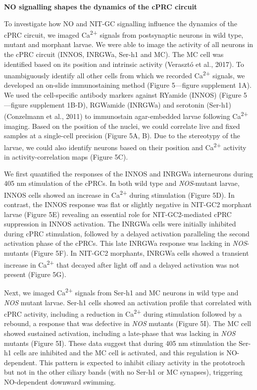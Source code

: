 \documentclass[
  10pt,
  onecolumn]{article}
\begin{document}
\textbf{NO signalling shapes the dynamics of the cPRC circuit}

To investigate how NO and NIT-GC signalling influence the dynamics of
the cPRC circuit, we imaged Ca\textsuperscript{2+} signals from
postsynaptic neurons in wild type, mutant and morphant larvae. We were
able to image the activity of all neurons in the cPRC circuit (INNOS,
INRGWa, Ser-h1 and MC). The MC cell was identified based on its position
and intrinsic activity (Verasztó et al., 2017). To unambiguously
identify all other cells from which we recorded Ca\textsuperscript{2+}
signals, we developed an on-slide immunostaining method (Figure
5---figure supplement 1A). We used the cell-specific antibody markers
against RYamide (INNOS) (Figure 5---figure supplement 1B-D), RGWamide
(INRGWa) and serotonin (Ser-h1) (Conzelmann et al., 2011) to immunostain
agar-embedded larvae following Ca\textsuperscript{2+} imaging. Based on
the position of the nuclei, we could correlate live and fixed samples at
a single-cell precision (Figure 5A, B). Due to the stereotypy of the
larvae, we could also identify neurons based on their position and
Ca\textsuperscript{2+} activity in activity-correlation maps (Figure
5C).

We first quantified the responses of the INNOS and INRGWa interneurons
during 405 nm stimulation of the cPRCs. In both wild type and
\emph{NOS}-mutant larvae, INNOS cells showed an increase in
Ca\textsuperscript{2+} during stimulation (Figure 5D). In contrast, the
INNOS response was flat or slightly negative in NIT-GC2 morphant larvae
(Figure 5E) revealing an essential role for NIT-GC2-mediated cPRC
suppression in INNOS activation. The INRGWa cells were initially
inhibited during cPRC stimulation, followed by a delayed activation
paralleling the second activation phase of the cPRCs. This late INRGWa
response was lacking in \emph{NOS}-mutants (Figure 5F). In NIT-GC2
morphants, INRGWa cells showed a transient increase in
Ca\textsuperscript{2+} that decayed after light off and a delayed
activation was not present (Figure 5G).

Next, we imaged Ca\textsuperscript{2+} signals from Ser-h1 and MC
neurons in wild type and \emph{NOS} mutant larvae. Ser-h1 cells showed
an activation profile that correlated with cPRC activity, including a
reduction in Ca\textsuperscript{2+} during stimulation followed by a
rebound, a response that was defective in \emph{NOS} mutants (Figure
5I). The MC cell showed sustained activation, including a late-phase
that was lacking in \emph{NOS} mutants (Figure 5I). These data suggest
that during 405 nm stimulation the Ser-h1 cells are inhibited and the MC
cell is activated, and this regulation is NO-dependent. This pattern is
expected to inhibit ciliary activity in the prototroch but not in the
other ciliary bands (with no Ser-h1 or MC synapses), triggering
NO-dependent downward swimming.
\end{document}
